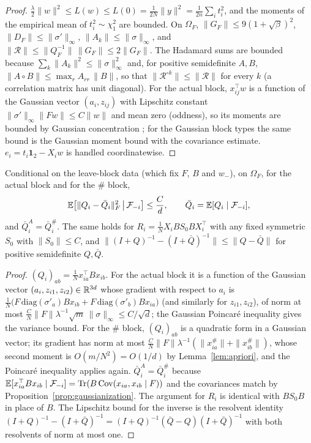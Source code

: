 \begin{proof}
$\frac\lambda2\|w\|^2\le L(w)\le L(0)=\frac1{2N}\|y\|^2=\frac1{2n}\sum_it_i^2$, and the moments of the empirical
mean of $t_i^2\sim\chi^2_1$ are bounded. On $\Omega_F$, $\|G_F\|\le9(1+\sqrt\beta)^2$, $\|D_F\|\le\|\sigma'\|_\infty$,
$\|A_k\|\le\|\sigma\|_\infty$, and $\|\mathscr R\|\le\|Q_F^{-1}\|\,\|G_F\|\le2\|G_F\|$. The Hadamard sums are
bounded because $\sum_k\|A_k\|^2\le\|\sigma\|_\infty^2$ and, for positive semidefinite $A,B$,
$\|A\circ B\|\le\max_rA_{rr}\,\|B\|$, so that $\|\mathscr R^{\circ k}\|\le\|\mathscr R\|$ for every $k$ (a correlation
matrix has unit diagonal). For the actual block, $x_{ij}^\top w$ is a function of the Gaussian vector
$(a_i,z_{ij})$ with Lipschitz constant $\|\sigma'\|_\infty\|Fw\|\le C\|w\|$ and mean zero (oddness), so its
moments are bounded by Gaussian concentration \cite[Theorem~5.6]{BLM}; for the Gaussian block types the
same bound is the Gaussian moment bound with the covariance estimate. $e_i=t_i\mathbf 1_2-X_iw$ is handled
coordinatewise.
\end{proof}

\begin{lemma}\label{lem:leverage2}
Conditional on the leave-block data (which fix $F$, $B$ and $w_-$), on $\Omega_F$, for the actual block and
for the $\#$ block,
\[
\mathbb{E}\big[\|Q_i-\bar Q_i\|_F^2\,\big|\,\mathcal F_{-i}\big]\le\frac Cd,\qquad \bar Q_i=\mathbb{E}[Q_i\mid\mathcal F_{-i}],
\]
and $\bar Q_i^A=\bar Q_i^\#$. The same holds for $R_i=\frac1NX_iBS_0BX_i^\top$ with any fixed symmetric
$S_0$ with $\|S_0\|\le C$, and $\|(I+Q)^{-1}-(I+\bar Q)^{-1}\|\le\|Q-\bar Q\|$ for positive semidefinite $Q,\bar Q$.
\end{lemma}

\begin{proof}
$(Q_i)_{ab}=\frac1Nx_{ia}^\top Bx_{ib}$. For the actual block it is a function of the Gaussian vector
$(a_i,z_{i1},z_{i2})\in\mathbb{R}^{3d}$ whose gradient with respect to $a_i$ is
$\frac1N\big(F\,\mathrm{diag}(\sigma'_a)Bx_{ib}+F\,\mathrm{diag}(\sigma'_b)Bx_{ia}\big)$ (and similarly for $z_{i1},z_{i2}$),
of norm at most $\frac CN\|F\|\lambda^{-1}\sqrt m\,\|\sigma\|_\infty\le C/\sqrt d$; the Gaussian Poincar\'e
inequality \cite[Theorem~3.20]{BLM} gives the variance bound. For the $\#$ block, $(Q_i)_{ab}$ is a quadratic
form in a Gaussian vector; its gradient has norm at most $\frac CN\|F\|\lambda^{-1}(\|x_{ia}^\#\|+\|x_{ib}^\#\|)$,
whose second moment is $O(m/N^2)=O(1/d)$ by Lemma~\ref{lem:apriori}, and the Poincar\'e inequality
applies again. $\bar Q_i^A=\bar Q_i^\#$ because $\mathbb{E}[x_{ia}^\top Bx_{ib}\mid\mathcal F_{-i}]=\operatorname{Tr}(B\,\mathrm{Cov}(x_{ia},x_{ib}\mid F))$
and the covariances match by Proposition~\ref{prop:gaussianization}. The argument for $R_i$ is identical
with $BS_0B$ in place of $B$. The Lipschitz bound for the inverse is the resolvent identity
$(I+Q)^{-1}-(I+\bar Q)^{-1}=(I+Q)^{-1}(\bar Q-Q)(I+\bar Q)^{-1}$ with both resolvents of norm at most one.
\end{proof}

